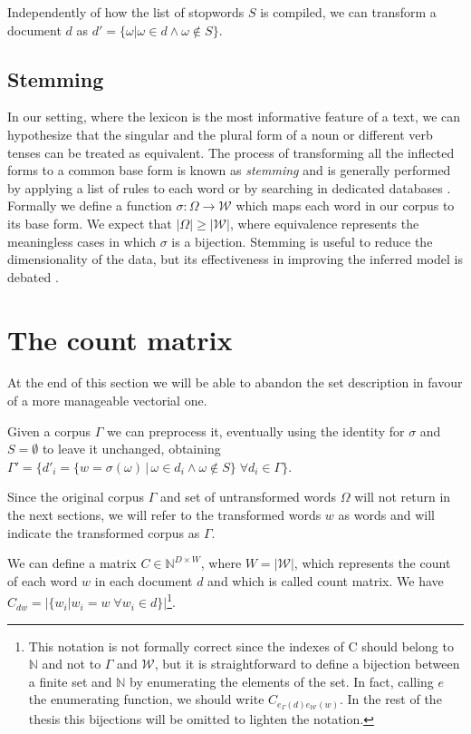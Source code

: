 \documentclass[11pt, a4paper, oneside, openright]{book}
\begin{document}
Independently of how the list of stopwords $S$ is compiled, we can transform a document $d$ as $d' = \{\omega | \omega \in d \wedge \omega \notin S \}$.

\subsection{Stemming}
In our setting, where the lexicon is the most informative feature of a text, we can hypothesize that the singular and the plural form of a noun or different verb tenses can be treated as equivalent.
The process of transforming all the inflected forms to a common base form is known as \textit{stemming} and is generally performed by applying a list of rules to each word \parencite{porter1980} or by searching in dedicated databases \parencite{miller1995}. 
Formally we define a function $\sigma: \Omega \rightarrow \mathcal{W}$ which maps each word in our corpus to its base form. We expect that $|\Omega| \geq |\mathcal{W}|$, where equivalence represents the meaningless cases in which $\sigma$ is a bijection.
Stemming is useful to reduce the dimensionality of the data, but its effectiveness in improving the inferred model is debated \parencite{schofield2016}.

\section{The count matrix}
\label{sec:count}
At the end of this section we will be able to abandon the set description in favour of a more manageable vectorial one.

Given a corpus $\Gamma$ we can preprocess it, eventually using the identity for $\sigma$ and $S = \emptyset$ to leave it unchanged, obtaining $\Gamma' = \{d'_i = \{w = \sigma(\omega)\, |\, \omega \in d_i \wedge \omega \notin S\} \; \forall d_i \in \Gamma \}$.

Since the original corpus $\Gamma$ and set of untransformed words $\Omega$ will not return in the next sections, we will refer to the transformed words $w$ as words and will indicate the transformed corpus as $\Gamma$.

We can define a matrix $C \in \mathbb{N}^{D \times W}$, where $W=|\mathcal{W}|$, which represents the count of each word $w$ in each document $d$ and which is called count matrix. We have $C_{dw} = |\{w_i | w_i = w \; \forall w_i \in d\}|$\footnote{This notation is not formally correct since the indexes of C should belong to $\mathbb{N}$ and not to $\Gamma$ and $\mathcal{W}$, but it is straightforward to define a bijection between a finite set and $\mathbb{N}$ by enumerating the elements of the set. In fact, calling $e$ the enumerating function, we should write $C_{ e_\Gamma (d) e_{\mathcal{W}} (w) }$. In the rest of the thesis this bijections will be omitted to lighten the notation.}.
\end{document}

